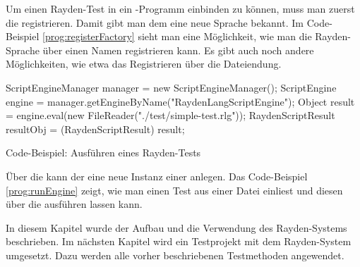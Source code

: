 \SuperPar
Um einen Rayden-Test in ein -Programm einbinden zu können, muss man zuerst die  registrieren. Damit gibt man dem  eine neue Sprache bekannt. Im Code-Beispiel \ref{prog:registerFactory} sieht man eine Möglichkeit, wie man die Rayden-Sprache über einen Namen registrieren kann. Es gibt auch noch andere Möglichkeiten, wie etwa das Registrieren über die Dateiendung.

\begin{program}
\begin{JavaCode}
ScriptEngineManager manager = new ScriptEngineManager();
ScriptEngine engine = manager.getEngineByName("RaydenLangScriptEngine");
Object result =  engine.eval(new FileReader("./test/simple-test.rlg"));
RaydenScriptResult resultObj = (RaydenScriptResult) result;
\end{JavaCode}
\caption{Code-Beispiel: Ausführen eines Rayden-Tests}
\label{prog:runEngine}
\end{program}

\SuperPar
Über die  kann der  eine neue Instanz einer  anlegen. Das Code-Beispiel \ref{prog:runEngine} zeigt, wie man einen Test aus einer Datei einliest und diesen über die  ausführen lassen kann.

\SuperPar
In diesem Kapitel wurde der Aufbau und die Verwendung des Rayden-Systems beschrieben. Im nächsten Kapitel wird ein Testprojekt mit dem Rayden-System umgesetzt. Dazu werden alle vorher beschriebenen Testmethoden angewendet.

